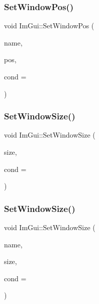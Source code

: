 \mbox{\label{namespace_im_gui_a32032b56f975bb3145adbe19f38f3b56}} 
\subsubsection{\texorpdfstring{Set\+Window\+Pos()}{SetWindowPos()}\hspace{0.1cm}{\footnotesize\ttfamily [2/2]}}
{\footnotesize\ttfamily void Im\+Gui\+::\+Set\+Window\+Pos (\begin{DoxyParamCaption}\item[{const char $\ast$}]{name,  }\item[{const \mbox{\hyperlink{struct_im_vec2}{Im\+Vec2}} \&}]{pos,  }\item[{\mbox{\hyperlink{imgui_8h_aef890d6ac872e12c5804d0b3e4f7f103}{Im\+Gui\+Cond}}}]{cond = {} }\end{DoxyParamCaption})}

\mbox{\label{namespace_im_gui_a657c6cc2246485332f608a5204447ea1}} 
\subsubsection{\texorpdfstring{Set\+Window\+Size()}{SetWindowSize()}\hspace{0.1cm}{\footnotesize\ttfamily [1/2]}}
{\footnotesize\ttfamily void Im\+Gui\+::\+Set\+Window\+Size (\begin{DoxyParamCaption}\item[{const \mbox{\hyperlink{struct_im_vec2}{Im\+Vec2}} \&}]{size,  }\item[{\mbox{\hyperlink{imgui_8h_aef890d6ac872e12c5804d0b3e4f7f103}{Im\+Gui\+Cond}}}]{cond = {} }\end{DoxyParamCaption})}

\mbox{\label{namespace_im_gui_a441528b9198d4531e79337121212cd33}} 
\subsubsection{\texorpdfstring{Set\+Window\+Size()}{SetWindowSize()}\hspace{0.1cm}{\footnotesize\ttfamily [2/2]}}
{\footnotesize\ttfamily void Im\+Gui\+::\+Set\+Window\+Size (\begin{DoxyParamCaption}\item[{const char $\ast$}]{name,  }\item[{const \mbox{\hyperlink{struct_im_vec2}{Im\+Vec2}} \&}]{size,  }\item[{\mbox{\hyperlink{imgui_8h_aef890d6ac872e12c5804d0b3e4f7f103}{Im\+Gui\+Cond}}}]{cond = {} }\end{DoxyParamCaption})}

